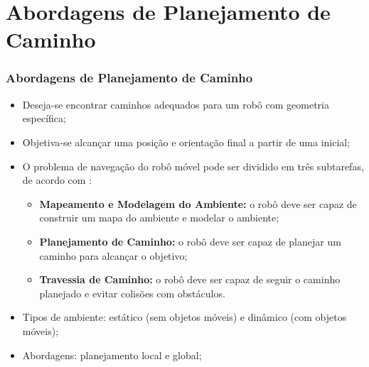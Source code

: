 \documentclass[xcolor=dvipsnames, aspectratio=169]{beamer}
\begin{document}
\section{Abordagens de Planejamento de Caminho}
\begin{frame}
  \frametitle{Abordagens de Planejamento de Caminho}
  \begin{itemize}
    \item Deseja-se encontrar caminhos adequados para um robô com geometria específica;
    \item Objetiva-se alcançar uma posição e orientação final a partir de uma inicial;
    \item O problema de navegação do robô móvel pode ser dividido em três subtarefas, de acordo com \cite{buniyamin2011simple}: 
    \begin{itemize}
      \item \textbf{Mapeamento e Modelagem do Ambiente:} o robô deve ser capaz de construir um mapa do ambiente e modelar o ambiente;
      \item \textbf{Planejamento de Caminho:} o robô deve ser capaz de planejar um caminho para alcançar o objetivo;
      \item \textbf{Travessia de Caminho:} o robô deve ser capaz de seguir o caminho planejado e evitar colisões com obstáculos.
    \end{itemize}
    \item Tipos de ambiente: estático (sem objetos móveis) e dinâmico (com objetos móveis);
    \item Abordagens: planejamento local e global;
  \end{itemize}
  
\end{frame}
\end{document}
